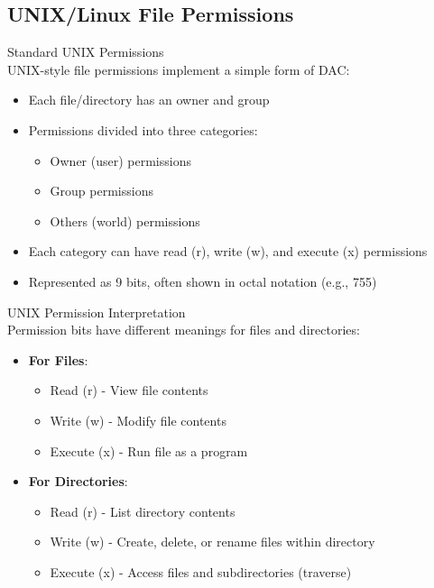 \subsection{UNIX/Linux File Permissions}

\begin{definition}{Standard UNIX Permissions}\\
UNIX-style file permissions implement a simple form of DAC:
\begin{itemize}
    \item Each file/directory has an owner and group
    \item Permissions divided into three categories:
    \begin{itemize}
        \item Owner (user) permissions
        \item Group permissions
        \item Others (world) permissions
    \end{itemize}
    \item Each category can have read (r), write (w), and execute (x) permissions
    \item Represented as 9 bits, often shown in octal notation (e.g., 755)
\end{itemize}
\end{definition}

\begin{concept}{UNIX Permission Interpretation}\\
Permission bits have different meanings for files and directories:
\begin{itemize}
    \item \textbf{For Files}:
    \begin{itemize}
        \item Read (r) - View file contents
        \item Write (w) - Modify file contents
        \item Execute (x) - Run file as a program
    \end{itemize}
    \item \textbf{For Directories}:
    \begin{itemize}
        \item Read (r) - List directory contents
        \item Write (w) - Create, delete, or rename files within directory
        \item Execute (x) - Access files and subdirectories (traverse)
    \end{itemize}
\end{itemize}
\end{concept}

